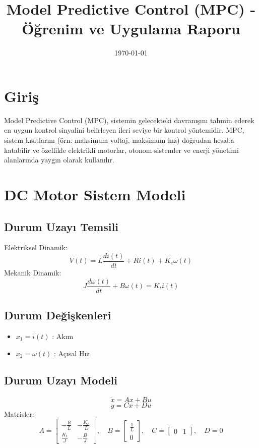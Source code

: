 \documentclass[12pt,a4paper]{article}
\title{Model Predictive Control (MPC) - Öğrenim ve Uygulama Raporu}
\date{\today}
\author{}
\begin{document}
\maketitle
\tableofcontents
\newpage

\section{Giriş}
Model Predictive Control (MPC), sistemin gelecekteki davranışını tahmin ederek en uygun kontrol sinyalini belirleyen ileri seviye bir kontrol yöntemidir. 
MPC, sistem kısıtlarını (örn: maksimum voltaj, maksimum hız) doğrudan hesaba katabilir ve özellikle elektrikli motorlar, otonom sistemler ve enerji yönetimi alanlarında yaygın olarak kullanılır.

\section{DC Motor Sistem Modeli}

\subsection{Durum Uzayı Temsili}
Elektriksel Dinamik:
\begin{equation}
V(t) = L \frac{di(t)}{dt} + Ri(t) + K_e \omega(t)
\end{equation}
Mekanik Dinamik:
\begin{equation}
J \frac{d\omega(t)}{dt} + B\omega(t) = K_t i(t)
\end{equation}

\subsection{Durum Değişkenleri}
\begin{itemize}
\item $x_1 = i(t)$ : Akım
\item $x_2 = \omega(t)$ : Açısal Hız
\end{itemize}

\subsection{Durum Uzayı Modeli}
\begin{equation}
\dot{x} = A x + B u
\end{equation}
\begin{equation}
y = C x + D u
\end{equation}
Matrisler:
\begin{equation}
A = \begin{bmatrix} -\frac{R}{L} & -\frac{K_e}{L} \\ \frac{K_t}{J} & -\frac{B}{J} \end{bmatrix}, \quad
B = \begin{bmatrix} \frac{1}{L} \\ 0 \end{bmatrix}, \quad
C = \begin{bmatrix} 0 & 1 \end{bmatrix}, \quad
D = 0
\end{equation}
\end{document}
